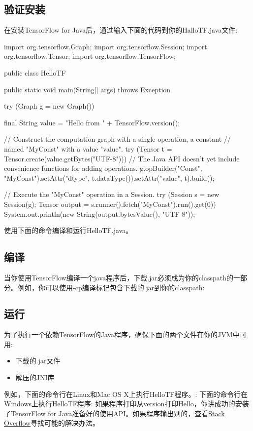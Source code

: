 \subsection{验证安装}
在安装TensorFlow for Java后，通过输入下面的代码到你的HalloTF.java文件:
\begin{javacode}
import org.tensorflow.Graph;
import org.tensorflow.Session;
import org.tensorflow.Tensor;
import org.tensorflow.TensorFlow;

public class HelloTF {
  public static void main(String[] args) throws Exception {
    try (Graph g = new Graph()) {
      final String value = "Hello from " + TensorFlow.version();

      // Construct the computation graph with a single operation, a constant
      // named "MyConst" with a value "value".
      try (Tensor t = Tensor.create(value.getBytes("UTF-8"))) {
        // The Java API doesn't yet include convenience functions for adding operations.
        g.opBuilder("Const", "MyConst").setAttr("dtype", t.dataType()).setAttr("value", t).build();
      }

      // Execute the "MyConst" operation in a Session.
      try (Session s = new Session(g);
           Tensor output = s.runner().fetch("MyConst").run().get(0)) {
        System.out.println(new String(output.bytesValue(), "UTF-8"));
      }
    }
  }
}
\end{javacode}
使用下面的命令编译和运行HelloTF.java。
\subsection{编译}
当你使用TensorFlow编译一个java程序后，下载.jar必须成为你的classpath的一部分。例如，你可以使用-cp编译标记包含下载的.jar到你的classpath:\newline 
{}\newline
\subsection{运行}
为了执行一个依赖TensorFlow的Java程序，确保下面的两个文件在你的JVM中可用:
\begin{itemize}
\item 下载的.jar文件
\item 解压的JNI库
\end{itemize}
例如，下面的命令行在Linux和Mac OS X上执行HelloTF程序。:\newline 
{}\newline
下面的命令行在Windows上执行HelloTF程序:\newline 
{}\newline 
如果程序打印从version打印Hello，你讲成功的安装了TensorFlow for Java准备好的使用API。如果程序输出别的，查看\href{http://stackoverflow.com/questions/tagged/tensorflow}{Stack Overflow}寻找可能的解决办法。
